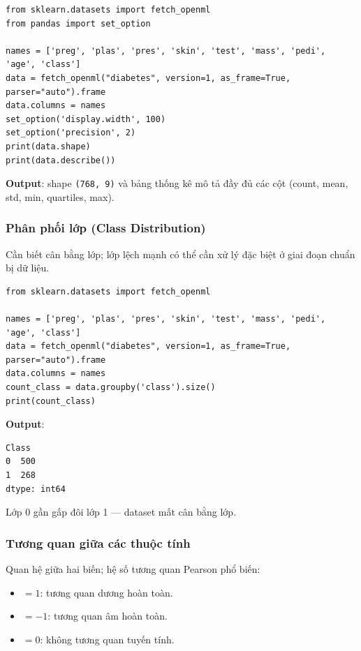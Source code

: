 \begin{vidu}[title={describe() trên Pima Indians Diabetes}]
\begin{lstlisting}
from sklearn.datasets import fetch_openml
from pandas import set_option

names = ['preg', 'plas', 'pres', 'skin', 'test', 'mass', 'pedi', 'age', 'class']
data = fetch_openml("diabetes", version=1, as_frame=True, parser="auto").frame
data.columns = names
set_option('display.width', 100)
set_option('precision', 2)
print(data.shape)
print(data.describe())
\end{lstlisting}
\textbf{Output}: shape \texttt{(768, 9)} và bảng thống kê mô tả đầy đủ các cột (count, mean, std, min, quartiles, max).
\end{vidu}

\subsubsection{Phân phối lớp (Class Distribution)}

\begin{ynghia}[title={Quan trọng trong classification}]
Cần biết cân bằng lớp; lớp lệch mạnh có thể cần xử lý đặc biệt ở giai đoạn chuẩn bị dữ liệu.
\end{ynghia}

\begin{vidu}[title={groupby().size() trên cột class}]
\begin{lstlisting}
from sklearn.datasets import fetch_openml

names = ['preg', 'plas', 'pres', 'skin', 'test', 'mass', 'pedi', 'age', 'class']
data = fetch_openml("diabetes", version=1, as_frame=True, parser="auto").frame
data.columns = names
count_class = data.groupby('class').size()
print(count_class)
\end{lstlisting}
\textbf{Output}:
\begin{lstlisting}
Class
0  500
1  268
dtype: int64
\end{lstlisting}
Lớp 0 gần gấp đôi lớp 1 --- dataset mất cân bằng lớp.
\end{vidu}

\subsubsection{Tương quan giữa các thuộc tính}

\begin{dinhnghia}[title={Correlation}]
Quan hệ giữa hai biến; hệ số tương quan Pearson phổ biến:
\begin{itemize}
  \item $= 1$: tương quan dương hoàn toàn.
  \item $= -1$: tương quan âm hoàn toàn.
  \item $= 0$: không tương quan tuyến tính.
\end{itemize}
\end{dinhnghia}

